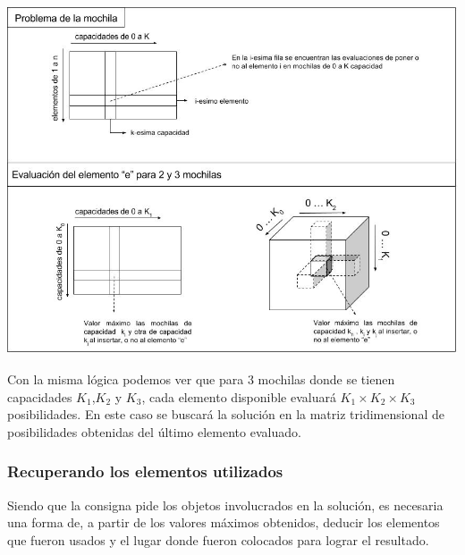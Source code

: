   \vspace*{0.3cm} \vspace*{0.3cm}
  \begin{center}
 \includegraphics[scale=0.6]{./EJ3/dibujo-matrices.jpg}
  \end{center}
  \vspace*{0.3cm}
  
  Con la misma lógica podemos ver que para 3 mochilas donde se tienen capacidades  $K_{1}$,$K_{2}$ y $K_{3}$, cada elemento disponible evaluará $K_{1} \times K_{2} \times K_{3}$ posibilidades. En este caso se buscará la solución en la matriz tridimensional de posibilidades obtenidas del último elemento evaluado.


\subsubsection*{Recuperando los elementos utilizados}

Siendo que la consigna pide los objetos involucrados en la solución, es necesaria una forma de, a partir de los valores máximos obtenidos, deducir los elementos que fueron usados y el lugar donde fueron colocados para lograr el resultado.\\

	

